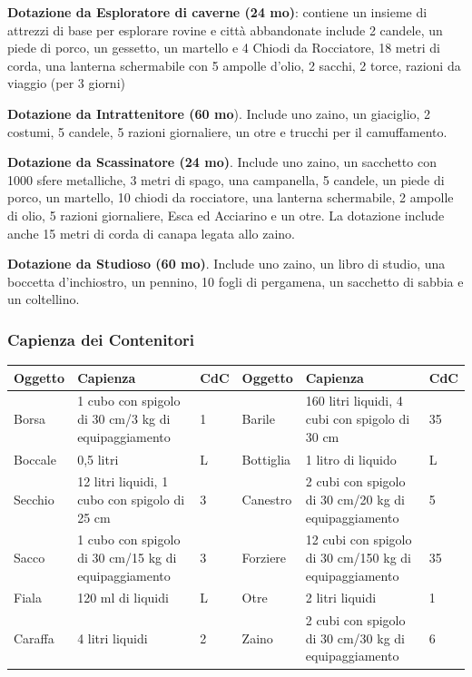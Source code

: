 \begin{multicols}{2}
\textbf{Dotazione da Esploratore di caverne (24 mo)}: contiene un insieme di attrezzi di base per esplorare rovine e città abbandonate include 2 candele, un piede di porco, un gessetto, un martello e 4 Chiodi da Rocciatore, 18 metri di corda, una lanterna schermabile con 5 ampolle d'olio, 2 sacchi, 2 torce, razioni da viaggio (per 3 giorni)

\textbf{Dotazione da Intrattenitore (60 mo}). Include uno zaino, un giaciglio, 2 costumi, 5 candele, 5 razioni giornaliere, un otre e trucchi per il camuffamento.

\textbf{Dotazione da Scassinatore (24 mo)}. Include uno zaino, un sacchetto con 1000 sfere metalliche, 3 metri di spago, una campanella, 5 candele, un piede di porco, un martello, 10 chiodi da rocciatore, una lanterna schermabile, 2 ampolle di olio, 5 razioni giornaliere, Esca ed Acciarino e un otre. La dotazione include anche 15 metri di corda di canapa legata allo zaino.

\textbf{Dotazione da Studioso (60 mo)}. Include uno zaino, un libro di studio, una boccetta d'inchiostro, un pennino, 10 fogli di pergamena, un sacchetto di sabbia e un coltellino.

\end{multicols}

\subsubsection{Capienza dei Contenitori}

\noindent\begin{tabularx}{\linewidth}{lXl|lXl}
	\toprule
\rowcolor{gray!20}\textbf{Oggetto}&\textbf{Capienza}&\textbf{CdC}&\textbf{Oggetto}&\textbf{Capienza}&\textbf{CdC}\\
\toprule
Borsa&1 cubo con spigolo di 30 cm/3 kg di equipaggiamento&1&Barile&160 litri liquidi, 4 cubi con spigolo di 30 cm&35\\
\rowcolor{gray!20}Boccale&0,5 litri&L&Bottiglia&1 litro di liquido&L\\
Secchio&12 litri liquidi, 1 cubo con spigolo di 25 cm&3&Canestro&2 cubi con spigolo di 30 cm/20 kg di equipaggiamento&5\\
\rowcolor{gray!20}Sacco&1 cubo con spigolo di 30 cm/15 kg di equipaggiamento&3&Forziere&12 cubi con spigolo di 30 cm/150 kg di equipaggiamento&35\\
Fiala&120 ml di liquidi&L&Otre&2 litri liquidi&1\\
\rowcolor{gray!20}Caraffa&4 litri liquidi&2&Zaino&2 cubi con spigolo di 30 cm/30 kg di equipaggiamento&6
\end{tabularx}


